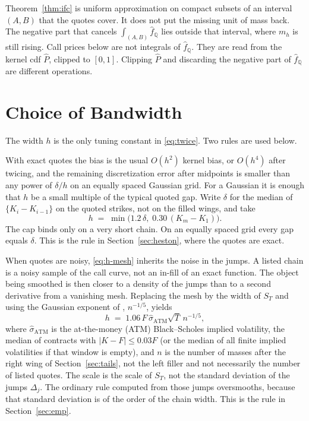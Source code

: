 \documentclass[preprint,12pt,authoryear,times]{elsarticle}
\newcommand{\Q}{\mathbb{Q}}
\begin{document}
Theorem~\ref{thm:ifc} is uniform approximation on compact subsets of an interval \((A,B)\) that the quotes cover. It does not put the missing unit of mass back. The negative part that cancels \(\int_{(A,B)}\hat f_{\Q}\) lies outside that interval, where \(m_h\) is still rising. Call prices below are not integrals of \(\hat f_{\Q}\). They are read from the kernel cdf \(\hat P\), clipped to \([0,1]\). Clipping \(\hat P\) and discarding the negative part of \(\hat f_{\Q}\) are different operations.

\section{Choice of Bandwidth}
\label{sec:h}

The width \(h\) is the only tuning constant in \eqref{eq:twice}. Two rules are used below.

With exact quotes the bias is the usual \(O(h^2)\) kernel bias, or \(O(h^4)\) after twicing, and the remaining discretization error after midpoints is smaller than any power of \(\delta/h\) on an equally spaced Gaussian grid. For a Gaussian it is enough that \(h\) be a small multiple of the typical quoted gap. Write \(\delta\) for the median of \(\{K_i-K_{i-1}\}\) on the quoted strikes, not on the filled wings, and take
\begin{equation}
\label{eq:h-mesh}
h
\;=\;
\min\bigl(1.2\,\delta,\; 0.30\,(K_m-K_1)\bigr).
\end{equation}
The cap binds only on a very short chain. On an equally spaced grid every gap equals \(\delta\). This is the rule in Section~\ref{sec:heston}, where the quotes are exact.

When quotes are noisy, \eqref{eq:h-mesh} inherits the noise in the jumps. A listed chain is a noisy sample of the call curve, not an in-fill of an exact function. The object being smoothed is then closer to a density of the jumps than to a second derivative from a vanishing mesh. Replacing the mesh by the width of \(S_T\) and using the Gaussian exponent of \citet{silverman1986}, \(n^{-1/5}\), yields
\begin{equation}
\label{eq:h-den}
h
\;=\;
1.06\,F\,\hat\sigma_{\mathrm{ATM}}\sqrt{T}\,n^{-1/5},
\end{equation}
where \(\hat\sigma_{\mathrm{ATM}}\) is the at-the-money (ATM) Black--Scholes implied volatility, the median of contracts with \(|K-F|\le 0.03F\) (or the median of all finite implied volatilities if that window is empty), and \(n\) is the number of masses after the right wing of Section~\ref{sec:tails}, not the left filler and not necessarily the number of listed quotes. The scale is the scale of \(S_T\), not the standard deviation of the jumps \(\Delta_j\). The ordinary \citeauthor{silverman1986} rule computed from those jumps oversmooths, because that standard deviation is of the order of the chain width. This is the rule in Section~\ref{sec:emp}.
\end{document}
